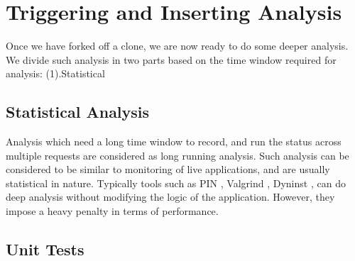 \section{Triggering and Inserting Analysis}
\label{sec:trigger}

Once we have forked off a clone, we are now ready to do some deeper analysis. 
We divide such analysis in two parts based on the time window required for analysis: (1).Statistical

\subsection{Statistical Analysis}
\label{sec:statisticalTests}

Analysis which need a long time window to record, and run the status across multiple requests are considered as long running analysis. 
Such analysis can be considered to be similar to monitoring of live applications, and are usually statistical in nature.
Typically tools such as PIN \cite{pin}, Valgrind \cite{valgrind}, Dyninst \cite{dyninst}, can do deep analysis without modifying the logic of the application.
However, they impose a heavy penalty in terms of performance.

\subsection{Unit Tests}
\label{sec:unitTests}

